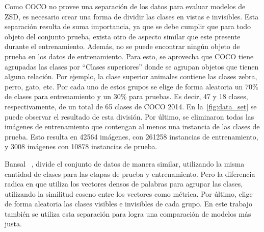 Como COCO no provee una separación de los datos para evaluar modelos de ZSD, es necesario crear una forma de dividir las clases en vistas e invisibles. Esta separación resulta de suma importancia, ya que se debe cumplir que para todo objeto del conjunto prueba, exista otro de aspecto similar que este presente durante el entrenamiento. Además, no se puede encontrar ningún objeto de prueba en los datos de entrenamiento. Para esto, se aprovecha que COCO tiene agrupadas las clases por ``Clases superiores'' donde se agrupan objetos que tienen alguna relación. Por ejemplo, la clase superior animales contiene las clases zebra, perro, gato, etc. Por cada uno de estos grupos se elige de forma aleatoria un 70\% de clases para entrenamiento y un 30\% para pruebas. Es decir, 47 y 18 clases, respectivamente, de un total de 65 clases de COCO 2014. En la~\autoref{fig:data_set} se puede observar el resultado de esta división. Por último, se eliminaron todas las imágenes de entrenamiento que contengan al menos una instancia de las clases de prueba. Esto resulta en 42564 imágenes, con 261258 instancias de entrenamiento, y 3008 imágenes con 10878 instancias de prueba. 

Bansal \etal~\cite{bansal2018zero}, divide el conjunto de datos de manera similar, utilizando la misma cantidad de clases para las etapas de prueba y entrenamiento. Pero la diferencia radica en que utiliza los vectores densos de palabras para agrupar las clases, utilizando la  similitud coseno entre los vectores como métrica. Por último, elige de forma aleatoria las clases visibles e invisibles de cada grupo. En este trabajo también se utiliza esta separación para logra una comparación de modelos más justa.


